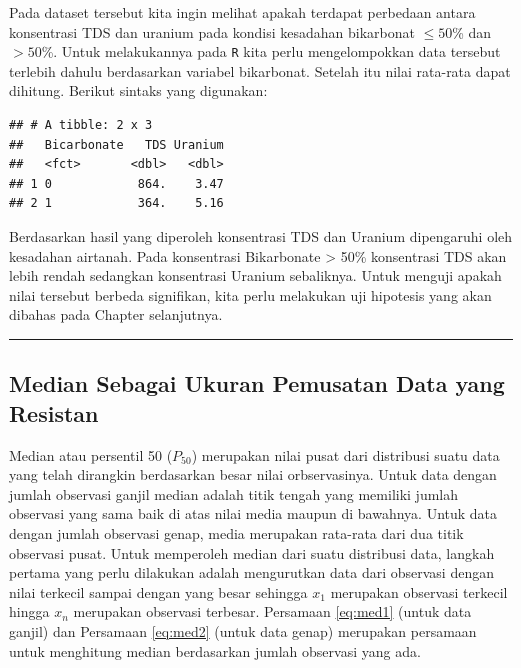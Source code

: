 \documentclass[]{book}
\newenvironment{Shaded}{\begin{snugshade}}{\end{snugshade}}
\newcommand{\KeywordTok}[1]{\textcolor[rgb]{0.13,0.29,0.53}{\textbf{#1}}}
\newcommand{\DataTypeTok}[1]{\textcolor[rgb]{0.13,0.29,0.53}{#1}}
\newcommand{\StringTok}[1]{\textcolor[rgb]{0.31,0.60,0.02}{#1}}
\newcommand{\OperatorTok}[1]{\textcolor[rgb]{0.81,0.36,0.00}{\textbf{#1}}}
\newcommand{\NormalTok}[1]{#1}
\begin{document}
Pada dataset tersebut kita ingin melihat apakah terdapat perbedaan
antara konsentrasi TDS dan uranium pada kondisi kesadahan bikarbonat
\(\leq 50\)\% dan \(> 50\)\%. Untuk melakukannya pada \texttt{R} kita
perlu mengelompokkan data tersebut terlebih dahulu berdasarkan variabel
bikarbonat. Setelah itu nilai rata-rata dapat dihitung. Berikut sintaks
yang digunakan:

\begin{Shaded}
\end{Shaded}

\begin{verbatim}
## # A tibble: 2 x 3
##   Bicarbonate   TDS Uranium
##   <fct>       <dbl>   <dbl>
## 1 0            864.    3.47
## 2 1            364.    5.16
\end{verbatim}

Berdasarkan hasil yang diperoleh konsentrasi TDS dan Uranium dipengaruhi
oleh kesadahan airtanah. Pada konsentrasi Bikarbonate \textgreater{}
50\% konsentrasi TDS akan lebih rendah sedangkan konsentrasi Uranium
sebaliknya. Untuk menguji apakah nilai tersebut berbeda signifikan, kita
perlu melakukan uji hipotesis yang akan dibahas pada Chapter
selanjutnya.

\begin{center}\rule{0.5\linewidth}{\linethickness}\end{center}

\subsection{Median Sebagai Ukuran Pemusatan Data yang
Resistan}\label{median-sebagai-ukuran-pemusatan-data-yang-resistan}

Median atau persentil 50 (\(P_{50}\)) merupakan nilai pusat dari
distribusi suatu data yang telah dirangkin berdasarkan besar nilai
orbservasinya. Untuk data dengan jumlah observasi ganjil median adalah
titik tengah yang memiliki jumlah observasi yang sama baik di atas nilai
media maupun di bawahnya. Untuk data dengan jumlah observasi genap,
media merupakan rata-rata dari dua titik observasi pusat. Untuk
memperoleh median dari suatu distribusi data, langkah pertama yang perlu
dilakukan adalah mengurutkan data dari observasi dengan nilai terkecil
sampai dengan yang besar sehingga \(x_1\) merupakan observasi terkecil
hingga \(x_n\) merupakan observasi terbesar. Persamaan \eqref{eq:med1}
(untuk data ganjil) dan Persamaan \eqref{eq:med2} (untuk data genap)
merupakan persamaan untuk menghitung median berdasarkan jumlah observasi
yang ada.
\end{document}
